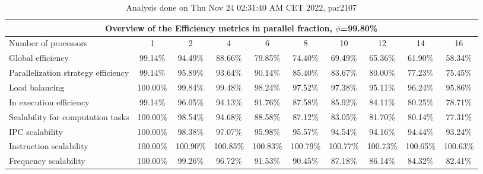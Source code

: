 \begin{table}[h]
\begin{center}
\begin{tabular}{|l|c|c|c|c|c|c|c|c|c|}
\hline
\multicolumn{10}{|c|}{Overview of the Efficiency metrics in parallel fraction, $\phi$=99.80\%} \\
\hline
\hline
Number of processors & 1 & 2 & 4 & 6 & 8 & 10 & 12 & 14 & 16 \\
\hline
\hline
Global efficiency                      &     99.14\% &     94.49\% &     88.66\% &     79.85\% &     74.40\% &     69.49\% &     65.36\% &     61.90\% &     58.34\% \\
\hline
\hline
Parallelization strategy efficiency &     99.14\% &     95.89\% &     93.64\% &     90.14\% &     85.40\% &     83.67\% &     80.00\% &     77.23\% &     75.45\% \\
\hline
Load balancing                   &    100.00\% &     99.84\% &     99.48\% &     98.24\% &     97.52\% &     97.38\% &     95.11\% &     96.24\% &     95.86\% \\
In execution efficiency          &     99.14\% &     96.05\% &     94.13\% &     91.76\% &     87.58\% &     85.92\% &     84.11\% &     80.25\% &     78.71\% \\
\hline
\hline
Scalability for computation tasks   &    100.00\% &     98.54\% &     94.68\% &     88.58\% &     87.12\% &     83.05\% &     81.70\% &     80.14\% &     77.31\% \\
\hline
IPC scalability                  &    100.00\% &     98.38\% &     97.07\% &     95.98\% &     95.57\% &     94.54\% &     94.16\% &     94.44\% &     93.24\% \\
Instruction scalability          &    100.00\% &    100.90\% &    100.85\% &    100.83\% &    100.79\% &    100.77\% &    100.73\% &    100.65\% &    100.63\% \\
Frequency scalability            &    100.00\% &     99.26\% &     96.72\% &     91.53\% &     90.45\% &     87.18\% &     86.14\% &     84.32\% &     82.41\% \\
\hline
\end{tabular}
\end{center}
\caption{ Analysis done on Thu Nov 24 02:31:40 AM CET 2022, par2107}
\end{table}
